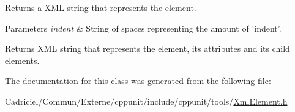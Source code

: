 Returns a X\-M\-L string that represents the element. 


\begin{DoxyParams}{Parameters}
{\em indent} & String of spaces representing the amount of 'indent'. \\
\hline
\end{DoxyParams}
\begin{DoxyReturn}{Returns}
X\-M\-L string that represents the element, its attributes and its child elements. 
\end{DoxyReturn}


The documentation for this class was generated from the following file\-:\begin{DoxyCompactItemize}
\item 
Cadriciel/\-Commun/\-Externe/cppunit/include/cppunit/tools/\hyperlink{_xml_element_8h}{Xml\-Element.\-h}\end{DoxyCompactItemize}
